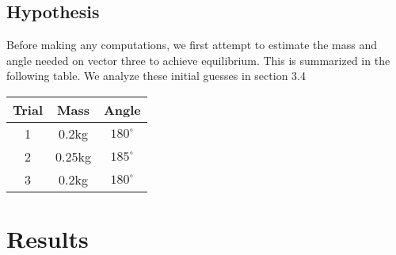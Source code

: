 \documentclass{report}
\begin{document}
    \bigbreak \noindent 
    \subsection{Hypothesis}
    \bigbreak \noindent 
    Before making any computations, we first attempt to estimate the mass and angle needed on vector three to achieve equilibrium. This is summarized in the following table. We analyze these initial guesses in section 3.4
    \bigbreak \noindent 
    \begin{center}
        \begin{tabular}{c|c|c}
            Trial & Mass & Angle \\
            \hline 
            1 &0.2kg & $180^{\circ}$\\
            2 & 0.25kg & $185^{\circ}$\\
            3 & 0.2kg & $180^{\circ}$\\
        \end{tabular}
    \end{center}
    \bigbreak \noindent 
    \bigbreak \noindent 

    \bigbreak \noindent 
    \section{Results}
    \smallbreak \noindent
\end{document}

